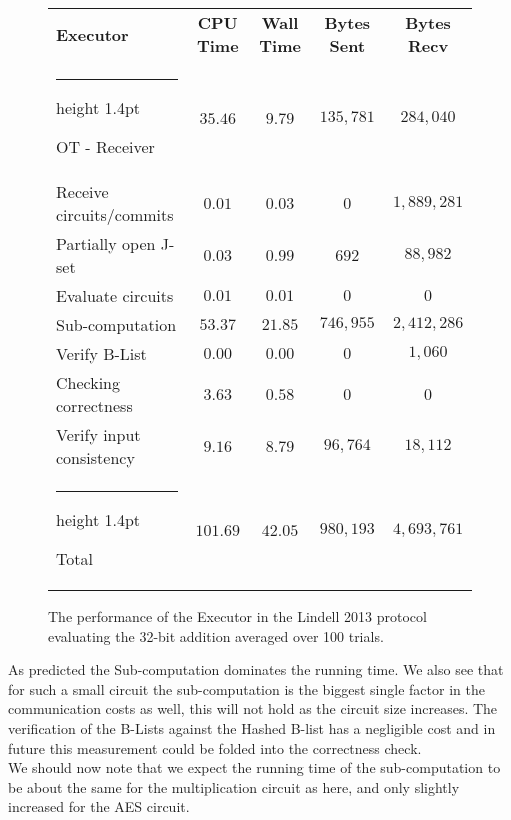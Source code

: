 \documentclass[11pt]{article} %
\makeatletter
\newcommand{\thickhline}{%
    \noalign {\ifnum 0=`}\fi \hrule height 1.4pt
    \futurelet \reserved@a \@xhline
}
\makeatother
\begin{document}
				\begin{figure}[!ht]
					\begin{tabular}{| p{4.3cm} | c c c c |}
						\hline
						\textbf{Executor} & \textbf{CPU Time} & \textbf{Wall Time} & \textbf{Bytes Sent} & \textbf{Bytes Recv} \\
						\thickhline
						OT - Receiver & $35.46$ & $9.79$ & $135,781$ & $284,040$ \\
						\hline
						Receive circuits/commits & $0.01$ & $0.03$ & $0$ & $1,889,281$ \\
						\hline
						Partially open J-set & $0.03$ & $0.99$ & $692$ & $88,982$ \\
						\hline
						Evaluate circuits & $0.01$ & $0.01$ & $0$ & $0$ \\
						\hline
						Sub-computation & $53.37$ & $21.85$ & $746,955$ & $2,412,286$ \\
						\hline
						Verify B-List & $0.00$ & $0.00$ & $0$ & $1,060$ \\
						\hline
						Checking correctness & $3.63$ & $0.58$ & $0$ & $0$ \\
						\hline
						Verify input consistency & $9.16$ & $8.79$ & $96,764$ & $18,112$ \\
						\thickhline
						Total & $101.69$ & $42.05$ & $980,193$ & $4,693,761$ \\
						\hline
					\end{tabular}
					\caption{The performance of the Executor in the Lindell 2013 protocol evaluating the 32-bit addition averaged over 100 trials. \label{table:L_2013_Add_Executor}}
				\end{figure}
				\FloatBarrier

				As predicted the Sub-computation dominates the running time. We also see that for such a small circuit the sub-computation is the biggest single factor in the communication costs as well, this will not hold as the circuit size increases. The verification of the B-Lists against the Hashed B-list has a negligible cost and in future this measurement could be folded into the correctness check.\\

				We should now note that we expect the running time of the sub-computation to be about the same for the multiplication circuit as here, and only slightly increased for the AES circuit.\\
\end{document}
